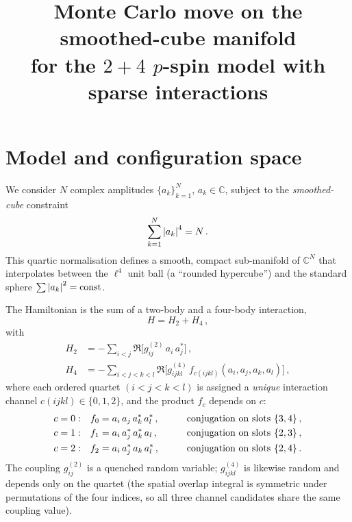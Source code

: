 \documentclass[11pt,a4paper]{article}
\title{Monte Carlo move on the smoothed-cube manifold\\
       for the $2{+}4$ $p$-spin model with sparse interactions}
\author{}
\date{}
\begin{document}
\maketitle

\section{Model and configuration space}

We consider $N$ complex amplitudes $\{a_k\}_{k=1}^{N}$, $a_k\in\mathbb{C}$,
subject to the \emph{smoothed-cube} constraint
\begin{equation}\label{eq:cube}
  \sum_{k=1}^{N} \abs{a_k}^4 = N \,.
\end{equation}
This quartic normalisation defines a smooth, compact sub-manifold of
$\mathbb{C}^N$ that interpolates between the $\ell^4$ unit ball (a
``rounded hypercube'') and the standard sphere $\sum\abs{a_k}^2=\mathrm{const}$.

The Hamiltonian is the sum of a two-body and a four-body interaction,
\begin{equation}\label{eq:H}
  H = H_2 + H_4 \,,
\end{equation}
with
\begin{align}
  H_2 &= -\sum_{i<j} \Re\bigl[ g^{(2)}_{ij}\, a_i\, a_j^* \bigr] \,,
  \label{eq:H2}\\[4pt]
  H_4 &= -\sum_{i<j<k<l}
         \Re\bigl[ g^{(4)}_{ijkl}\, f_{c(ijkl)}(a_i,a_j,a_k,a_l) \bigr] \,,
  \label{eq:H4}
\end{align}
where each ordered quartet $(i<j<k<l)$ is assigned a \emph{unique}
interaction channel $c(ijkl)\in\{0,1,2\}$, and the product $f_c$ depends
on $c$:
\begin{alignat}{2}
  c=0:&\quad f_0 = a_i\, a_j\, a_k^*\, a_l^* \,,
       &\qquad & \text{conjugation on slots } \{3,4\}\,,\notag\\
  c=1:&\quad f_1 = a_i\, a_j^*\, a_k^*\, a_l \,,
       && \text{conjugation on slots } \{2,3\}\,,\notag\\
  c=2:&\quad f_2 = a_i\, a_j^*\, a_k\, a_l^* \,,
       && \text{conjugation on slots } \{2,4\}\,.\notag
\end{alignat}
The coupling $g^{(2)}_{ij}$ is a quenched random variable; $g^{(4)}_{ijkl}$
is likewise random and depends only on the quartet (the spatial overlap
integral is symmetric under permutations of the four indices, so all three
channel candidates share the same coupling value).
\end{document}
